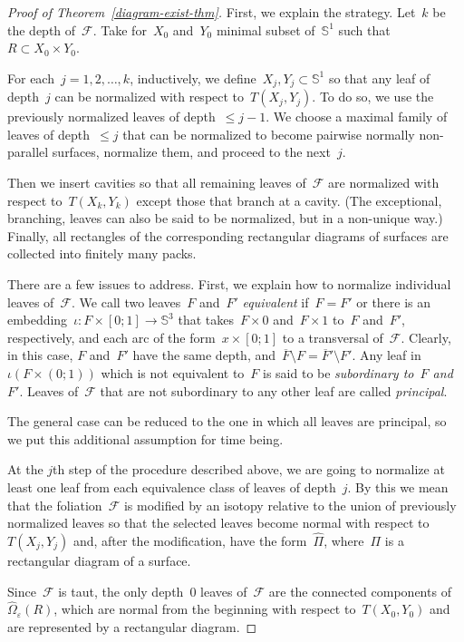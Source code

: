 \documentclass{amsart}
\theoremstyle{theorem}
\theoremstyle{remark}
\theoremstyle{definition}
\numberwithin{equation}{section}
\numberwithin{figure}{section}
\begin{document}
\begin{proof}[Proof of Theorem~\ref{diagram-exist-thm}]
First, we explain the strategy. Let~$k$ be the depth of~$\mathscr F$. Take for~$X_0$ and~$Y_0$
minimal subset of~$\mathbb S^1$ such that~$R\subset X_0\times Y_0$.

For each~$j=1,2,\ldots,k$, inductively, we define~$X_j,Y_j\subset\mathbb S^1$ so that any leaf
of depth~$j$ can be normalized with respect to~$T(X_j,Y_j)$. To do so, we use the previously normalized
leaves of depth~$\leqslant j-1$. We choose a maximal family of leaves of depth~$\leqslant j$ that can be normalized
to become pairwise normally non-parallel surfaces, normalize them, and proceed to the next~$j$.

Then we insert cavities so that all remaining leaves of~$\mathscr F$ are normalized with
respect to~$T(X_k,Y_k)$ except those that branch at a cavity. (The exceptional,
branching, leaves can also be said to be normalized, but in a non-unique way.) Finally,
all rectangles of the corresponding rectangular diagrams of surfaces are collected
into finitely many packs.

There are a few issues to address. First, we explain how to normalize individual leaves of~$\mathscr F$.
We call two leaves~$F$ and~$F'$ \emph{equivalent} if~$F=F'$ or there is an
embedding~$\iota:{}F\times[0;1]\rightarrow\mathbb S^3$ that takes~$F\times0$ and~$F\times1$
to~$F$ and~$F'$, respectively, and each arc of the form~$x\times[0;1]$ to a transversal of~$\mathscr F$. Clearly, in this case, $F$ and~$F'$ have the same depth, and~$\overline F\setminus F=\overline F'\setminus F'$.
Any leaf in~$\iota(F\times(0;1))$ which is not equivalent to~$F$ is said to be \emph{subordinary to~$F$ and~$F'$}.
Leaves of~$\mathscr F$ that are not subordinary to any other leaf are called \emph{principal}.

The general case can be reduced to the one in which all leaves are principal, so we put this additional assumption
for time being.

At the $j$th step of the procedure described above, we are going to normalize at least one leaf from
each equivalence class of leaves of depth~$j$. By this we mean that the foliation~$\mathscr F$ is modified
by an isotopy relative to the union of previously normalized leaves so that the selected leaves become normal with
respect to~$T(X_j,Y_j)$ and, after the modification, have the form~$\widehat\Pi$, where~$\Pi$ is a rectangular
diagram of a surface.

Since~$\mathscr F$ is taut, the only depth~$0$
leaves of~$\mathscr F$ are the connected components of~$\widehat\Omega_\varepsilon(R)$,
which are normal from the beginning with respect to~$T(X_0,Y_0)$ and are represented by a rectangular diagram.


\end{proof}
\end{document}
